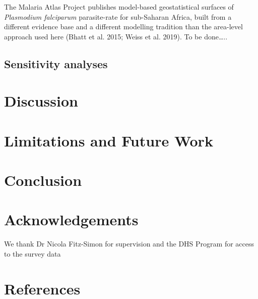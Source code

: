 \documentclass{article}
\begin{document}
The Malaria Atlas Project publishes model-based geostatistical surfaces
of \emph{Plasmodium falciparum} parasite-rate for sub-Saharan Africa,
built from a different evidence base and a different modelling tradition
than the area-level approach used here ({Bhatt et al.} 2015; {Weiss et
al.} 2019). To be done\ldots..

\subsection{Sensitivity analyses}\label{sensitivity-analyses}

\section{Discussion}\label{sec:discussion}

\section{Limitations and Future Work}\label{sec:limitations}

\section{Conclusion}\label{sec:conclusion}

\section*{Acknowledgements}\label{acknowledgements}

We thank Dr Nicola Fitz-Simon for supervision and the DHS Program for
access to the survey data

\section*{References}\label{references}
\end{document}
